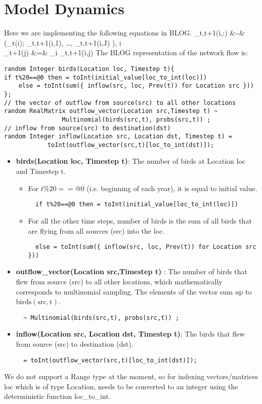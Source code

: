 \documentclass[11pt]{article}
\begin{document}
\section{Model Dynamics}
Here we are implementing the following equations in BLOG.
\beq
	_{t,t+1}(i,:) &\sim&  \left(_t(i);  \theta_{t,t+1}(i,1), \dots, \theta_{t,t+1}(i,J) \right), \forall i \in [1, I] \nn \\
	_{t+1}(j) &=& \sum_{i} _{t,t+1}(i,j)
\eeq
The BLOG representation of the network flow is:
\begin{lstlisting}
random Integer birds(Location loc, Timestep t){ 
if t%20==@0 then = toInt(initial_value[loc_to_int(loc)]) 
    else = toInt(sum({ inflow(src, loc, Prev(t)) for Location src })) 
}; 
// the vector of outflow from source(src) to all other locations 
random RealMatrix outflow_vector(Location src,Timestep t) ~
				Multinomial(birds(src,t), probs(src,t)) ; 
// inflow from source(src) to destination(dst) 
random Integer inflow(Location src, Location dst, Timestep t) = 
			toInt(outflow_vector(src,t)[loc_to_int(dst)]); 
\end{lstlisting}
\begin{itemize}
\item \textbf{birds(Location loc, Timestep t)}: The number of birds at Location loc and Timestep t. 
\begin{itemize}
	\item For $t\%20 == @0$ (i.e. beginning of each year), it is equal to initial value. 
	\begin{lstlisting}
  if t%20==@0 then = toInt(initial_value[loc_to_int(loc)]) 
	\end{lstlisting}
	\item For all the other time steps, number of birds is the sum of all birds that are flying from all sources (src) into the loc.
	\begin{lstlisting}
  else = toInt(sum({ inflow(src, loc, Prev(t)) for Location src })) 
	\end{lstlisting}
\end{itemize}
\item \textbf{outflow\_vector(Location src,Timestep t) }: The number of birds that flew from source (src) to all other locations, which mathematically corresponds to multinomial sampling. The elements of the vector sum up to $\mathrm{birds(src,t)}$.
	\begin{lstlisting}
  ~ Multinomial(birds(src,t), probs(src,t)) ; 
	\end{lstlisting}
\item 
\textbf{ inflow(Location src, Location dst, Timestep t)}: The birds that flew from source (src) to destination (dst). 
	\begin{lstlisting}
  = toInt(outflow_vector(src,t)[loc_to_int(dst)]);
	\end{lstlisting}
\end{itemize}
\begin{remark}
We do not support a Range type at the moment, so for indexing vectors/matrices loc which is of type Location, needs to be converted to an integer using the deterministic function loc\_to\_int.
\end{remark}
\end{document}
